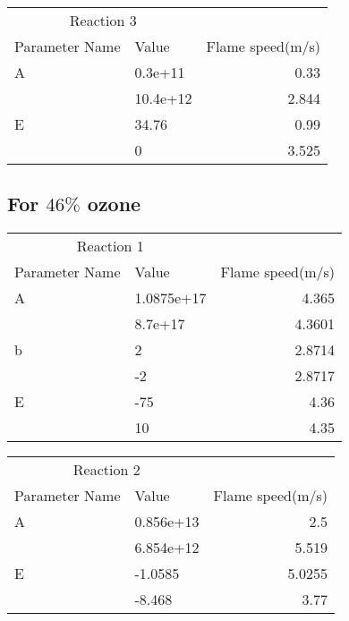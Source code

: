   
     \begin{tabular}{llr}  
    \toprule
    \multicolumn{2}{c}{Reaction 3} \\
    \cmidrule(r){1-2}
    Parameter Name  & Value &  Flame speed(m/s)\\
    \midrule
    A      & 0.3e+11    & 0.33      \\
           &  10.4e+12     & 2.844       \\
   
    E      & 34.76    & 0.99      \\
           &   0     & 3.525       \\
    
    \bottomrule
  \end{tabular}
  
  
  
   \subsection{For $46\%$ ozone}
   \begin{tabular}{llr}  
    \toprule
    \multicolumn{2}{c}{Reaction 1} \\
    \cmidrule(r){1-2}
    Parameter Name  & Value & Flame speed(m/s)\\
    \midrule
    A      & 1.0875e+17    & 4.365      \\
           &  8.7e+17     & 4.3601       \\
    b      & 2    &   2.8714      \\
           &    -2     & 2.8717       \\
    E      & -75    & 4.36      \\
           &   10     & 4.35       \\
    
    \bottomrule
  \end{tabular}
  
   \begin{tabular}{llr}  
    \toprule
    \multicolumn{2}{c}{Reaction 2} \\
    \cmidrule(r){1-2}
    Parameter Name  & Value &  Flame speed(m/s)\\
    \midrule
    A      & 0.856e+13    & 2.5      \\
           &  6.854e+12     & 5.519       \\
   
    E      & -1.0585    & 5.0255      \\
           &   -8.468     & 3.77       \\
    
    \bottomrule
  \end{tabular}
  
